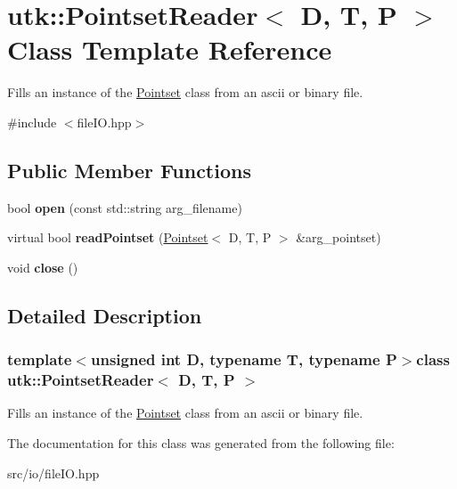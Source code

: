 \hypertarget{classutk_1_1PointsetReader}{\section{utk\-:\-:Pointset\-Reader$<$ D, T, P $>$ Class Template Reference}
\label{classutk_1_1PointsetReader}
}


Fills an instance of the \hyperlink{classutk_1_1Pointset}{Pointset} class from an ascii or binary file.  




{\ttfamily \#include $<$file\-I\-O.\-hpp$>$}

\subsection*{Public Member Functions}
\begin{DoxyCompactItemize}
\item 
\hypertarget{classutk_1_1PointsetReader_aa2f5cf05ce69982d8cab7353c981bb3b}{bool {\bfseries open} (const std\-::string arg\-\_\-filename)}\label{classutk_1_1PointsetReader_aa2f5cf05ce69982d8cab7353c981bb3b}

\item 
\hypertarget{classutk_1_1PointsetReader_a2c0646b6433cf2896c001015a6544102}{virtual bool {\bfseries read\-Pointset} (\hyperlink{classutk_1_1Pointset}{Pointset}$<$ D, T, P $>$ \&arg\-\_\-pointset)}\label{classutk_1_1PointsetReader_a2c0646b6433cf2896c001015a6544102}

\item 
\hypertarget{classutk_1_1PointsetReader_a481325b7ec8e5c2ab86b03ef79f18ee3}{void {\bfseries close} ()}\label{classutk_1_1PointsetReader_a481325b7ec8e5c2ab86b03ef79f18ee3}

\end{DoxyCompactItemize}


\subsection{Detailed Description}
\subsubsection*{template$<$unsigned int D, typename T, typename P$>$class utk\-::\-Pointset\-Reader$<$ D, T, P $>$}

Fills an instance of the \hyperlink{classutk_1_1Pointset}{Pointset} class from an ascii or binary file. 

The documentation for this class was generated from the following file\-:\begin{DoxyCompactItemize}
\item 
src/io/file\-I\-O.\-hpp\end{DoxyCompactItemize}
